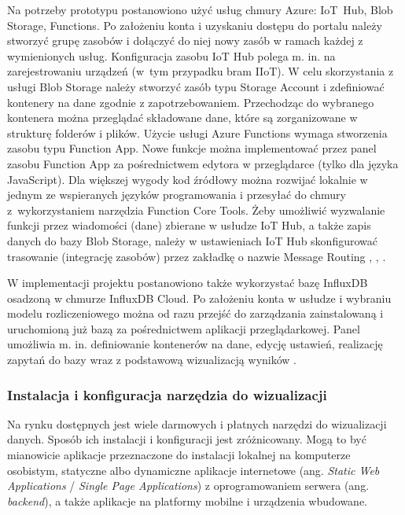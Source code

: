 \documentclass[a4paper, 12pt, twoside]{article}
\begin{document}
Na potrzeby prototypu postanowiono użyć usług chmury Azure:
IoT~Hub, Blob Storage, Functions. Po założeniu konta i uzyskaniu
dostępu do portalu należy stworzyć grupę zasobów i dołączyć do niej nowy zasób
w ramach każdej z wymienionych usług.
Konfiguracja zasobu IoT Hub polega m. in. na zarejestrowaniu urządzeń (w~tym przypadku bram IIoT).
W celu skorzystania z usługi Blob Storage należy stworzyć zasób typu
Storage Account i zdefiniować kontenery na dane zgodnie z zapotrzebowaniem.
Przechodząc do wybranego kontenera można przeglądać składowane dane, które
są zorganizowane w strukturę folderów i plików.
Użycie usługi Azure Functions wymaga stworzenia zasobu typu Function App.
Nowe funkcje można implementować przez panel zasobu Function App za pośrednictwem
edytora w przeglądarce (tylko dla języka JavaScript). Dla większej wygody
kod źródłowy można rozwijać lokalnie w jednym ze wspieranych języków programowania
i przesyłać do chmury z~wykorzystaniem narzędzia Function Core Tools.
Żeby umożliwić wyzwalanie funkcji przez wiadomości (dane) zbierane w usłudze IoT Hub,
a także zapis danych do bazy Blob Storage, należy w ustawieniach IoT Hub
skonfigurować trasowanie (integrację zasobów) przez zakładkę o nazwie Message Routing
\cite{iot-hub-doc}, \cite{blob-storage-doc}, \cite{functions-doc}.

W implementacji projektu postanowiono także wykorzystać bazę InfluxDB
osadzoną w chmurze InfluxDB Cloud. Po założeniu konta w usłudze i wybraniu
modelu rozliczeniowego można od razu przejść do zarządzania zainstalowaną
i uruchomioną już bazą za pośrednictwem aplikacji przeglądarkowej. Panel
umożliwia m. in. definiowanie kontenerów na dane, edycję ustawień,
realizację zapytań do bazy wraz z podstawową wizualizacją wyników \cite{influx-db}.


\subsubsection{Instalacja i konfiguracja narzędzia do wizualizacji}\label{grafana-conf}

Na rynku dostępnych jest wiele darmowych i płatnych narzędzi do wizualizacji danych.
Sposób ich instalacji i konfiguracji jest zróżnicowany. Mogą to być mianowicie
aplikacje przeznaczone do instalacji lokalnej na komputerze osobistym,
statyczne albo dynamiczne aplikacje internetowe (ang. \emph{Static Web Applications} / \emph{Single Page Applications})
z oprogramowaniem serwera (ang. \emph{backend}), a także
aplikacje na platformy mobilne i urządzenia wbudowane.
\end{document}

